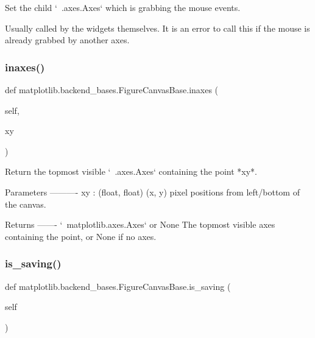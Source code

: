 \begin{DoxyVerb}Set the child `~.axes.Axes` which is grabbing the mouse events.

Usually called by the widgets themselves. It is an error to call this
if the mouse is already grabbed by another axes.
\end{DoxyVerb}
 \mbox{\label{classmatplotlib_1_1backend__bases_1_1FigureCanvasBase_ab062f31d9e9965d21a2d13ca47d7d301}} 
\subsubsection{\texorpdfstring{inaxes()}{inaxes()}}
{\footnotesize\ttfamily def matplotlib.\+backend\+\_\+bases.\+Figure\+Canvas\+Base.\+inaxes (\begin{DoxyParamCaption}\item[{}]{self,  }\item[{}]{xy }\end{DoxyParamCaption})}

\begin{DoxyVerb}Return the topmost visible `~.axes.Axes` containing the point *xy*.

Parameters
----------
xy : (float, float)
    (x, y) pixel positions from left/bottom of the canvas.

Returns
-------
`~matplotlib.axes.Axes` or None
    The topmost visible axes containing the point, or None if no axes.
\end{DoxyVerb}
 \mbox{\label{classmatplotlib_1_1backend__bases_1_1FigureCanvasBase_a96ac4833a333fdbf9dbec92f7cc69d3f}} 
\subsubsection{\texorpdfstring{is\+\_\+saving()}{is\_saving()}}
{\footnotesize\ttfamily def matplotlib.\+backend\+\_\+bases.\+Figure\+Canvas\+Base.\+is\+\_\+saving (\begin{DoxyParamCaption}\item[{}]{self }\end{DoxyParamCaption})}


